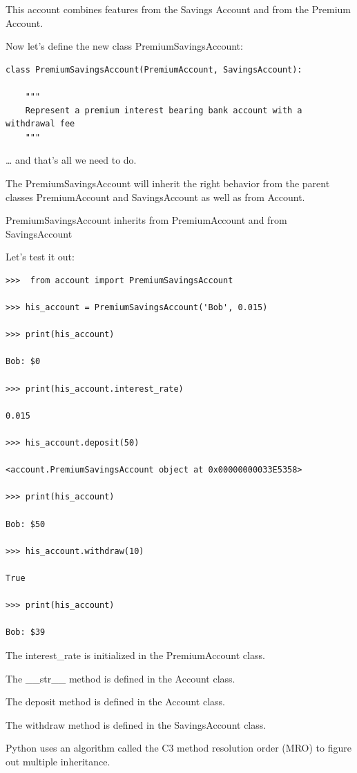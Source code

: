 \documentclass{article}
\begin{document}
This account combines features from the Savings Account and from the Premium Account.

Now let’s define the new class PremiumSavingsAccount:

\begin{lstlisting}
class PremiumSavingsAccount(PremiumAccount, SavingsAccount):
 
    """
    Represent a premium interest bearing bank account with a withdrawal fee
    """
\end{lstlisting}

… and that’s all we need to do.  

The PremiumSavingsAccount will inherit the right behavior from the parent classes PremiumAccount and SavingsAccount as well as from Account.

PremiumSavingsAccount inherits from PremiumAccount and from SavingsAccount

Let’s test it out:

\begin{lstlisting}
>>>  from account import PremiumSavingsAccount

>>> his_account = PremiumSavingsAccount('Bob', 0.015)

>>> print(his_account)

Bob: $0

>>> print(his_account.interest_rate)

0.015

>>> his_account.deposit(50)

<account.PremiumSavingsAccount object at 0x00000000033E5358>

>>> print(his_account)

Bob: $50

>>> his_account.withdraw(10)

True

>>> print(his_account)

Bob: $39
\end{lstlisting}

The interest{\_}rate is initialized in the PremiumAccount class.

The {\_}{\_}str{\_}{\_} method is defined in the Account class.

The deposit method is defined in the Account class.

The withdraw method is defined in the SavingsAccount class.

Python uses an algorithm called  the C3 method resolution order (MRO) to figure out multiple inheritance.
\end{document}
